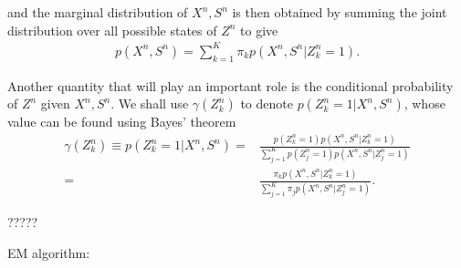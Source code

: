 \documentclass[11pt]{extarticle}
\newcommand{\0}{\mathbf{0}}
\renewcommand{\(}{\left(}
\renewcommand{\)}{\right)}
\theoremstyle{definition}
\begin{document}
and the marginal distribution of $X^{n}, S^{n}$ is then obtained by summing the joint distribution over all possible states of $Z^{n}$ to give
\begin{align*}
	p(X^{n}, S^{n}) = \sum_{k=1}^{K} \pi_{k} p(X^{n}, S^{n} \vert Z^{n}_{k}=1).
\end{align*}
\par Another quantity that will play an important role is the conditional probability of $Z^{n}$ given $X^{n}, S^{n}$. We shall use $\gamma(Z^{n}_{k})$ to denote $p(Z^{n}_{k} = 1 \vert X^{n}, S^{n})$, whose value can be found using Bayes' theorem
\begin{align*}
	\gamma(Z^{n}_{k}) \equiv p(Z^{n}_{k} = 1 \vert X^{n}, S^{n}) =& \frac{p(Z^{n}_{k}=1)p(X^{n}, S^{n} \vert Z^{n}_{k} = 1)}{\sum_{j=1}^{K}p(Z^{n}_{j}=1)p(X^{n}, S^{n} \vert Z^{n}_{j}=1)} \\
	=& \frac{\pi_{k} p(X^{n}, S^{n} \vert Z^{n}_{k} = 1)}{\sum_{j=1}^{K}\pi_{j} p(X^{n}, S^{n} \vert Z^{n}_{j}=1)}.
\end{align*}
\par ?????
\par EM algorithm:
\end{document}
